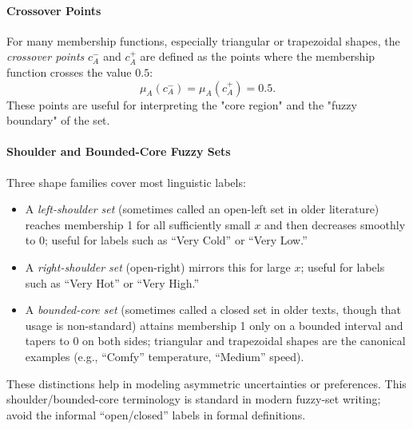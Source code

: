 \paragraph{Crossover Points} For many membership functions, especially triangular or trapezoidal shapes, the \emph{crossover points} \( c^-_A \) and \( c^+_A \) are defined as the points where the membership function crosses the value \( 0.5 \):
\[
    \mu_A(c^-_A) = \mu_A(c^+_A) = 0.5.
\]
These points are useful for interpreting the "core region" and the "fuzzy boundary" of the set.

\paragraph{Shoulder and Bounded-Core Fuzzy Sets}
Three shape families cover most linguistic labels:
\begin{itemize}
  \item A \emph{left-shoulder set} (sometimes called an open-left set in older literature) reaches membership 1 for all sufficiently small \(x\) and then decreases smoothly to 0; useful for labels such as ``Very Cold'' or ``Very Low.''
  \item A \emph{right-shoulder set} (open-right) mirrors this for large \(x\); useful for labels such as ``Very Hot'' or ``Very High.''
  \item A \emph{bounded-core set} (sometimes called a closed set in older texts, though that usage is non-standard) attains membership 1 only on a bounded interval and tapers to 0 on both sides; triangular and trapezoidal shapes are the canonical examples (e.g., ``Comfy'' temperature, ``Medium'' speed).
\end{itemize}
These distinctions help in modeling asymmetric uncertainties or preferences. This shoulder/bounded-core terminology is standard in modern fuzzy-set writing; avoid the informal ``open/closed'' labels in formal definitions.

